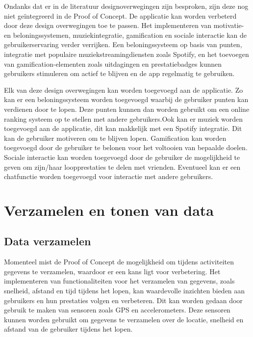Ondanks dat er in de literatuur designoverwegingen zijn besproken, zijn deze nog niet geïntegreerd in de Proof of Concept. De applicatie kan worden verbeterd door deze design overwegingen toe te passen. Het implementeren van motivatie- en beloningssystemen, muziekintegratie, gamification en sociale interactie kan de gebruikerservaring verder verrijken. Een beloningssysteem op basis van punten, integratie met populaire muziekstreamingdiensten zoals Spotify, en het toevoegen van gamification-elementen zoals uitdagingen en prestatiebadges kunnen gebruikers stimuleren om actief te blijven en de app regelmatig te gebruiken.

\vspace{1cm}


Elk van deze design overwegingen kan worden toegevoegd aan de applicatie. Zo kan er een beloningssysteem worden toegevoegd waarbij de gebruiker punten kan verdienen door te lopen. Deze punten kunnen dan worden gebruikt om een online ranking systeem op te stellen met andere gebruikers.Ook kan er muziek worden toegevoegd aan de applicatie, dit kan makkelijk met een Spotify integratie. Dit kan de gebruiker motiveren om te blijven lopen. Gamification kan worden toegevoegd door de gebruiker te belonen voor het voltooien van bepaalde doelen. Sociale interactie kan worden toegevoegd door de gebruiker de mogelijkheid te geven om zijn/haar loopprestaties te delen met vrienden. Eventueel kan er een chatfunctie worden toegevoegd voor interactie met andere gebruikers.

\section{Verzamelen en tonen van data}

\subsection{Data verzamelen}

Momenteel mist de Proof of Concept de mogelijkheid om tijdens activiteiten gegevens te verzamelen, waardoor er een kans ligt voor verbetering. Het implementeren van functionaliteiten voor het verzamelen van gegevens, zoals snelheid, afstand en tijd tijdens het lopen, kan waardevolle inzichten bieden aan gebruikers en hun prestaties volgen en verbeteren. Dit kan worden gedaan door gebruik te maken van sensoren zoals GPS en accelerometers. Deze sensoren kunnen worden gebruikt om gegevens te verzamelen over de locatie, snelheid en afstand van de gebruiker tijdens het lopen.

